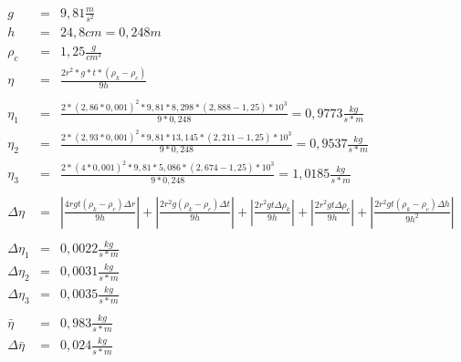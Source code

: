 \documentclass[wide,a4paper,titlepage,12pt]{mwart}
\begin{document}
    \begin{eqnarray*}
      g &=& 9,81 \frac{m}{s^2} \\
      h &=& 24,8 cm = 0,248 m \\
      \rho_c &=& 1,25 \frac{g}{cm^3} \\
      \eta &=& \frac{2r^2 * g * t * (\rho_k - \rho_c)}{9h} \\
      \\
      \eta_1 &=& \frac{2*(2,86 * 0,001)^2 * 9,81 * 8,298 * (2,888 - 1,25)*10^3}{9*0,248} = 0,9773 \frac{kg}{s*m}\\
      \eta_2 &=& \frac{2*(2,93 * 0,001)^2 * 9,81 * 13,145 * (2,211 - 1,25)*10^3}{9*0,248} = 0,9537 \frac{kg}{s*m}\\
      \eta_3 &=& \frac{2*(4 * 0,001)^2 * 9,81 * 5,086 * (2,674 - 1,25)*10^3}{9*0,248} = 1,0185 \frac{kg}{s*m}\\
      \\
      \Delta \eta &=& \left |  \frac{4rgt(\rho_k-\rho_c)\Delta r}{9h}  \right | +      \left |  \frac{2r^2g(\rho_k-\rho_c)\Delta t}{9h}  \right | +      \left |  \frac{2r^2gt\Delta \rho_k}{9h}  \right | +      \left |  \frac{2r^2gt\Delta \rho_c}{9h}  \right | +      \left |  \frac{2r^2gt(\rho_k-\rho_c)\Delta h}{9h^2}  \right | \\
      \\
      \Delta \eta_1 &=& 0,0022 \frac{kg}{s*m}\\
      \Delta \eta_2 &=& 0,0031 \frac{kg}{s*m}\\
      \Delta \eta_3 &=& 0,0035 \frac{kg}{s*m} \\
      \\
      \bar{\eta} &=& 0,983 \frac{kg}{s*m} \\
      \Delta \bar{\eta} &=& 0,024 \frac{kg}{s*m} \\
    \end{eqnarray*}
    \clearpage
    
\end{document}
